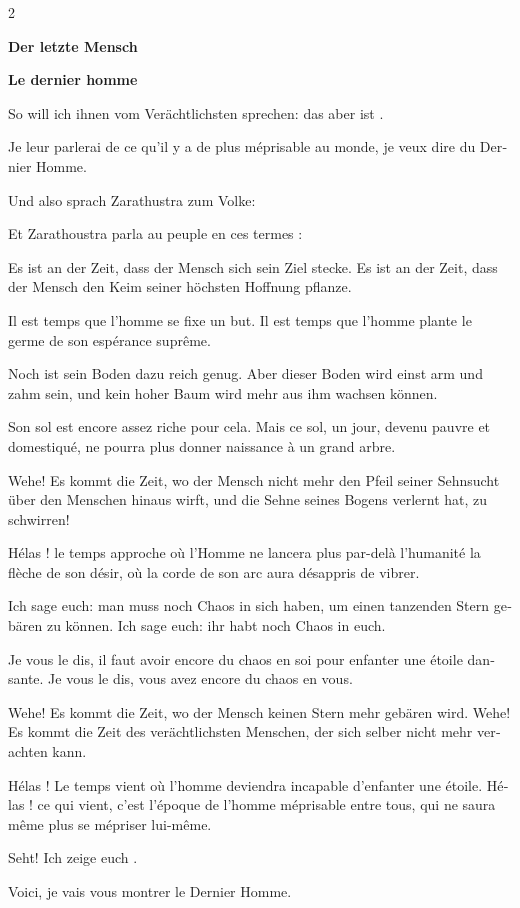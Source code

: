 \documentclass[a4paper,11pt]{article}
\newcommand\chunks[2]{%
\begin{leftcolumn*}\begin{otherlanguage}{german}%
{#1}%
\end{otherlanguage}\end{leftcolumn*}%
\begin{rightcolumn}\begin{otherlanguage}{french}%
{#2}%
\end{otherlanguage}\end{rightcolumn}%
}
\begin{document}
\thispagestyle{empty}
\setlength{\columnsep}{8mm}
\setlength{\columnseprule}{0.4pt}

\begin{paracol}{2}
  \chunks{\begin{center}
          \textbf{Der letzte Mensch}
          \end{center}}
         {\begin{center}
          \textbf{Le dernier homme}
          \end{center}}
         
  \chunks{So will ich ihnen vom Verächtlichsten sprechen: das aber ist \textls{der letzte Mensch}.}%
         {Je leur parlerai de ce qu'il y a de plus méprisable au monde, je veux dire du Dernier Homme.}
  \chunks{Und also sprach Zarathustra zum Volke:}
         {Et Zarathoustra parla au peuple en ces termes :}
  \chunks{Es ist an der Zeit, dass der Mensch sich sein Ziel stecke. Es ist an der Zeit, dass der Mensch den Keim seiner höchsten Hoffnung pflanze.}
         {Il est temps que l'homme se fixe un but. Il est temps que l'homme plante le germe de son espérance suprême.}
  \chunks{Noch ist sein Boden dazu reich genug. Aber dieser Boden wird einst arm und zahm sein, und kein hoher Baum wird mehr aus ihm wachsen können.}
         {Son sol est encore assez riche pour cela. Mais ce sol, un jour, devenu pauvre et domestiqué, ne pourra plus donner naissance à un grand arbre.}
  \chunks{Wehe! Es kommt die Zeit, wo der Mensch nicht mehr den Pfeil seiner Sehnsucht über den Menschen hinaus wirft, und die Sehne seines Bogens verlernt hat, zu schwirren!}
         {Hélas ! le temps approche où l'Homme ne lancera plus par-delà l'humanité la flèche de son désir, où la corde de son arc aura désappris de vibrer.}
  \chunks{Ich sage euch: man muss noch Chaos in sich haben, um einen tanzenden Stern gebären zu können. Ich sage euch: ihr habt noch Chaos in euch.}
         {Je vous le dis, il faut avoir encore du chaos en soi pour enfanter une étoile dansante. Je vous le dis, vous avez encore du chaos en vous.}
  \chunks{Wehe! Es kommt die Zeit, wo der Mensch keinen Stern mehr gebären wird. Wehe! Es kommt die Zeit des verächtlichsten Menschen, der sich selber nicht mehr verachten kann.}
         {Hélas ! Le temps vient où l'homme deviendra incapable d'enfanter une étoile. Hélas ! ce qui vient, c'est l'époque de l'homme méprisable entre tous, qui ne saura même plus se mépriser lui-même.}
  \chunks{Seht! Ich zeige euch .}
         {Voici, je vais vous montrer le Dernier Homme.}

\end{paracol}
\end{document}
